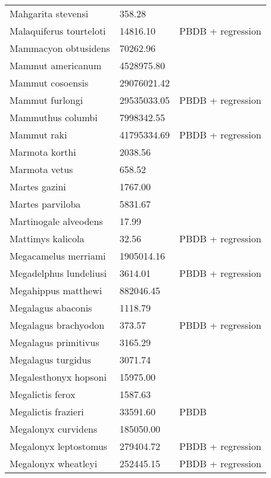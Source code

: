 \documentclass{article}
\begin{document}
\begin{center}
\begin{longtable}{p{} p{} p{}}
    Mahgarita stevensi & 358.28 & \cite{Wortman1893} \\ 
    Malaquiferus tourteloti & 14816.10 & PBDB + regression \\ 
    Mammacyon obtusidens & 70262.96 & \cite{Tomiya2013} \\ 
    Mammut americanum & 4528975.80 & \cite{Smith2004} \\ 
    Mammut cosoensis & 29076021.42 & \cite{Secord2008a} \\ 
    Mammut furlongi & 29535033.05 & PBDB + regression \\ 
    Mammuthus columbi & 7998342.55 & \cite{Smith2004} \\ 
    Mammut raki & 41795334.69 & PBDB + regression \\ 
    Marmota korthi & 2038.56 & \cite{Tomiya2013} \\ 
    Marmota vetus & 658.52 & \cite{Tomiya2013} \\ 
    Martes gazini & 1767.00 & \cite{McKenna2011} \\ 
    Martes parviloba & 5831.67 & \cite{Macdonald1951} \\ 
    Martinogale alveodens & 17.99 & \cite{Tomiya2013} \\ 
    Mattimys kalicola & 32.56 & PBDB + regression \\ 
    Megacamelus merriami & 1905014.16 & \cite{Tomiya2013} \\ 
    Megadelphus lundeliusi & 3614.01 & PBDB + regression \\ 
    Megahippus matthewi & 882046.45 & \cite{Tomiya2013} \\ 
    Megalagus abaconis & 1118.79 & \cite{Tomiya2013} \\ 
    Megalagus brachyodon & 373.57 & PBDB + regression \\ 
    Megalagus primitivus & 3165.29 & \cite{Tomiya2013} \\ 
    Megalagus turgidus & 3071.74 & \cite{Tomiya2013} \\ 
    Megalesthonyx hopsoni & 15975.00 & \cite{Hay1916} \\ 
    Megalictis ferox & 1587.63 & \cite{Tomiya2013} \\ 
    Megalictis frazieri & 33591.60 & PBDB \\ 
    Megalonyx curvidens & 185050.00 & \cite{McDonald2005} \\ 
    Megalonyx leptostomus & 279404.72 & PBDB + regression \\ 
    Megalonyx wheatleyi & 252445.15 & PBDB + regression \\ 

\end{longtable}
\end{center}
\end{document}
